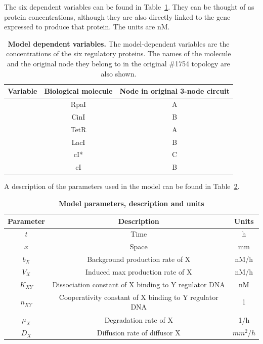 The six dependent variables can be found in Table~\ref{tab:Model variables}.
They can be thought of as protein concentrations,
although they are also directly linked to the gene expressed to produce that protein.
The units are nM.
\begin{table}[H]
    \centering
    \caption{\textbf{Model dependent variables.} The model-dependent variables are the concentrations of the six regulatory proteins.
    The names of the molecule and the original node they belong to in the original \#1754 topology are also shown.}
    \label{tab:Model variables}
    \renewcommand{\arraystretch}{1.3} %
    \begin{tabular}{|c|c|c|}
        \hline
        \textbf{Variable} & \textbf{Biological molecule} & \textbf{Node in original 3-node circuit}\\
        \hline
        [A] & RpaI & A\\
        \hline
        [B] & CinI & B \\
        \hline
        [C] & TetR & A\\
        \hline
        [D] & LacI & B \\
        \hline
        [E] & cI* & C \\
        \hline
        [F] & cI & B \\
        \hline
    \end{tabular}
\end{table}
A description of the parameters used in the model can be found in Table~\ref{tab:model params}.

\begin{table}[H]
    \centering
    \caption{\textbf{Model parameters, description and units}}
    \label{tab:model params}
    \renewcommand{\arraystretch}{1.3} %
    \begin{tabular}{|c|c|c|}
        \hline
        \textbf{Parameter} & \textbf{Description} & \textbf{Units}\\
        \hline
        $t$ & Time & h\\
        \hline
        $x$ & Space & mm\\
        \hline
        $b_{X}$ & Background production rate of X & nM/h\\
        \hline
        $V_{X}$ & Induced max production rate of X & nM/h \\
        \hline
        $K_{XY}$ & Dissociation constant of X binding to Y regulator DNA & nM \\
        \hline
        $n_{XY}$ & Cooperativity constant of X binding to Y regulator DNA & 1\\
        \hline
        $\mu_{X}$ & Degradation rate of X & 1/h\\
        \hline
        $D_{X}$ & Diffusion rate of diffusor X & $mm^2/h$\\
        \hline

    \end{tabular}
\end{table}


